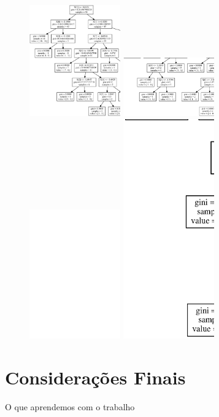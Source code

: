 \documentclass[12pt, a4paper, brazil]{article}
\begin{document}
\begin{landscape}
\begin{figure}[!htb]
    \includegraphics[width=0.35\textwidth]{fertility/arvore.eps} 
    \includegraphics[width=0.35\textwidth]{Habermans_Survival/arvore.eps}    
    \includegraphics[width=0.35\textwidth]{Pima_Indians_Diabetes/arvore.eps}
    \includegraphics[width=0.35\textwidth]{Mammographic_Mass/arvore.eps}
\end{figure}
\end{landscape}

\section{Considerações Finais}
O que aprendemos com o trabalho
\newpage

\end{document}

